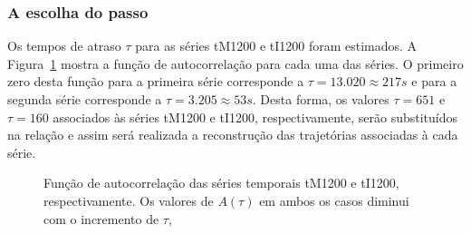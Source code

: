 \subsubsection{A escolha do passo}
Os tempos de atraso $\tau$ para as séries tM1200 e tI1200 foram estimados. %
A Figura~\ref{figautocorrtMI0681200} mostra a função de autocorrelação para cada uma das séries. O primeiro zero desta função para a primeira série corresponde a $\tau=13.020\approx217s$ e para a segunda série corresponde a $\tau=3.205\approx 53s$. Desta forma, os valores $\tau=651$ e $\tau=160$ associados às séries tM1200 e tI1200, respectivamente, serão substituídos na relação %
e assim será realizada a reconstrução das trajetórias associadas à cada série.  


\begin{figure}[ht]
\centering {}
\caption{Função de autocorrelação das séries temporais tM1200 e tI1200, respectivamente. Os valores de $A(\tau)$ em ambos os casos diminui com o incremento de $\tau$, }
\label{figautocorrtMI0681200}
\end{figure}

